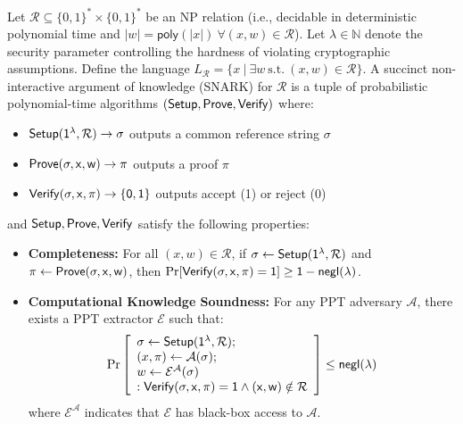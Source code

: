 \begin{definition}\label{def:snark}
    \noindent Let $\mathcal{R} \subseteq \{0, 1\}^{*} \times \{0, 1\}^{*}$ be an NP relation (i.e., decidable in deterministic polynomial time and $|w| = \mathsf{poly}(|x|)\ \forall (x, w) \in \mathcal{R}$). Let $\lambda \in \mathbb{N}$ denote the security parameter controlling the hardness of violating cryptographic assumptions. Define the language $L_\mathcal{R} = \{x\ |\ \exists w\ \text{s.t.}\ (x, w) \in \mathcal{R}\}$. A succinct non-interactive argument of knowledge (SNARK) for $\mathcal{R}$ is a tuple of probabilistic polynomial-time algorithms $(\sf{Setup}, \sf{Prove}, \sf{Verify})$ where:
\begin{itemize}
    \item $\sf{Setup}(1^{\lambda}, \mathcal{R}) \rightarrow \sigma$ outputs a common reference string $\sigma$
    \item $\sf{Prove}(\sigma, x, w) \rightarrow \pi$ outputs a proof $\pi$
    \item $\sf{Verify}(\sigma, x, \pi) \rightarrow \{0, 1\}$ outputs accept (1) or reject (0)
\end{itemize}

\noindent and $\sf{Setup}, \sf{Prove}, \sf{Verify}$ satisfy the following properties:
\begin{itemize}
    \item \textbf{Completeness:} For all $(x, w) \in \mathcal{R}$, if $\sigma \leftarrow \sf{Setup}(1^{\lambda}, \mathcal{R})$ and $\pi \leftarrow \sf{Prove}(\sigma, x, w)$, then $\Pr[\sf{Verify}(\sigma, x, \pi) = 1] \geq 1 - \mathsf{negl}(\lambda)$.
    
    \item \textbf{Computational Knowledge Soundness:} For any PPT adversary $\mathcal{A}$, there exists a PPT extractor $\mathcal{E}$ such that:
    \begin{align*}
    \Pr\left[\begin{array}{l}
    \sigma \leftarrow \sf{Setup}(1^{\lambda}, \mathcal{R}); \\
    (x, \pi) \leftarrow \mathcal{A}(\sigma); \\
    w \leftarrow \mathcal{E}^{\mathcal{A}}(\sigma) \\
    : \sf{Verify}(\sigma, x, \pi) = 1 \land (x, w) \notin \mathcal{R}
    \end{array}\right] \leq \mathsf{negl}(\lambda)
    \end{align*}
    where $\mathcal{E}^{\mathcal{A}}$ indicates that $\mathcal{E}$ has black-box access to $\mathcal{A}$.
    

\end{itemize}
\end{definition}
